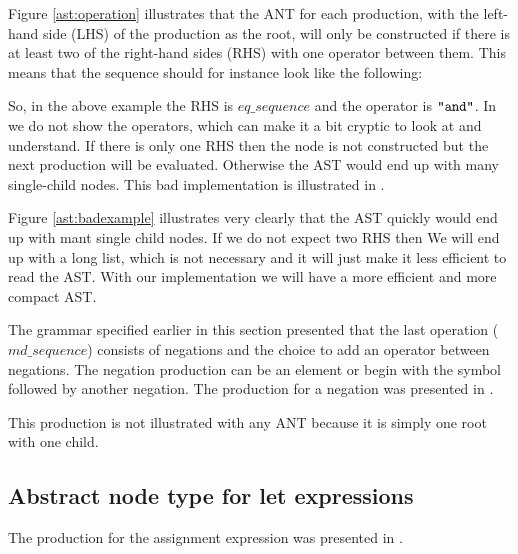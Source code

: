 Figure \ref{ast:operation} illustrates that the ANT for each production, with
the left-hand side (LHS) of the production as the root, will only be constructed
if there is at least two of the right-hand sides (RHS) with one operator between
them. This means that the sequence should for instance look like the following:

\begin{ebnf}
\end{ebnf}

So, in the above example the RHS is $eq\_sequence$ and the operator is
$\texttt{"and"}$. In  we do not show the operators, which can
make it a bit cryptic to look at and understand. If there is only one RHS then
the node is not constructed but the next production will be evaluated. Otherwise
the AST would end up with many single-child nodes. This bad implementation is 
illustrated in .



Figure \ref{ast:badexample} illustrates very clearly that the AST quickly would
end up with mant single child nodes. If we do not expect two RHS then We will 
end up with a long list, which is not necessary and it will just make it less 
efficient to read the AST. With our implementation we will have a more efficient 
and more compact AST.

The grammar specified earlier in this section presented that the last operation
($md\_sequence$) consists of negations and the choice to add an operator between
negations. The negation production can be an element or begin with the \gter{-}
symbol followed by another negation. The production for a negation was presented
in .


This production is not illustrated with any ANT because it is simply one root
with one child.

\subsection{Abstract node type for let expressions}
The production for the assignment expression was presented in
.

